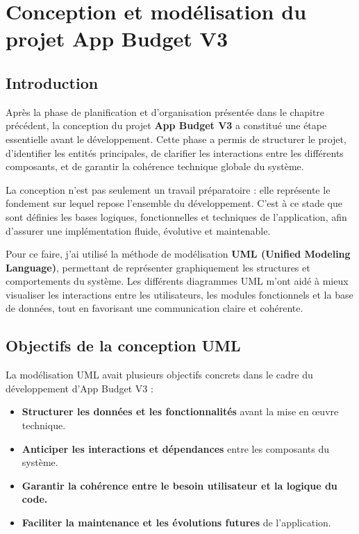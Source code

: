 \chapter{Conception et modélisation du projet App Budget V3}

\section{Introduction}

Après la phase de planification et d’organisation présentée dans le chapitre précédent, la conception du projet \textbf{App Budget V3} a constitué une étape essentielle avant le développement.  
Cette phase a permis de structurer le projet, d’identifier les entités principales, de clarifier les interactions entre les différents composants, et de garantir la cohérence technique globale du système.  

La conception n’est pas seulement un travail préparatoire : elle représente le fondement sur lequel repose l’ensemble du développement.  
C’est à ce stade que sont définies les bases logiques, fonctionnelles et techniques de l’application, afin d’assurer une implémentation fluide, évolutive et maintenable.

Pour ce faire, j’ai utilisé la méthode de modélisation \textbf{UML (Unified Modeling Language)}, permettant de représenter graphiquement les structures et comportements du système.  
Les différents diagrammes UML m’ont aidé à mieux visualiser les interactions entre les utilisateurs, les modules fonctionnels et la base de données, tout en favorisant une communication claire et cohérente.

\section{Objectifs de la conception UML}

La modélisation UML avait plusieurs objectifs concrets dans le cadre du développement d’App Budget V3 :

\begin{itemize}
    \item \textbf{Structurer les données et les fonctionnalités} avant la mise en œuvre technique.
    \item \textbf{Anticiper les interactions et dépendances} entre les composants du système.
    \item \textbf{Garantir la cohérence entre le besoin utilisateur et la logique du code.}
    \item \textbf{Faciliter la maintenance et les évolutions futures} de l’application.
\end{itemize}

